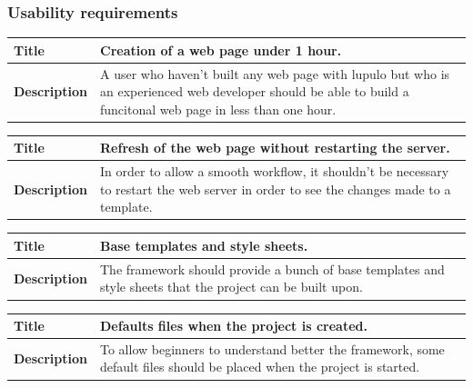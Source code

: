 \documentclass[12pt]{article}
\begin{document}
            \subsubsection{Usability requirements}
                \begin{tabularx}{\textwidth}{|l|X|}
                    \hline
                    \textbf{Title} & Creation of a web page under 1 hour. \\
                    \hline
                    \textbf{Description} & A user who haven't built any web page
                    with lupulo but who is an experienced web developer should
                    be able to build a funcitonal web page in less than one
                    hour. \\
                    \hline
                \end{tabularx}

                \begin{tabularx}{\textwidth}{|l|X|}
                    \hline
                    \textbf{Title} & Refresh of the web page without restarting
                    the server. \\
                    \hline
                    \textbf{Description} & In order to allow a smooth workflow,
                    it shouldn't be necessary to restart the web server in order
                    to see the changes made to a template. \\
                    \hline
                \end{tabularx}

                \begin{tabularx}{\textwidth}{|l|X|}
                    \hline
                    \textbf{Title} & Base templates and style sheets. \\
                    \hline
                    \textbf{Description} & The framework should provide a bunch
                    of base templates and style sheets that the project can be
                    built upon. \\
                    \hline
                \end{tabularx}

                \begin{tabularx}{\textwidth}{|l|X|}
                    \hline
                    \textbf{Title} & Defaults files when the project is created. \\
                    \hline
                    \textbf{Description} & To allow beginners to understand
                    better the framework, some default files should be placed
                    when the project is started. \\
                    \hline
                \end{tabularx}
\end{document}
